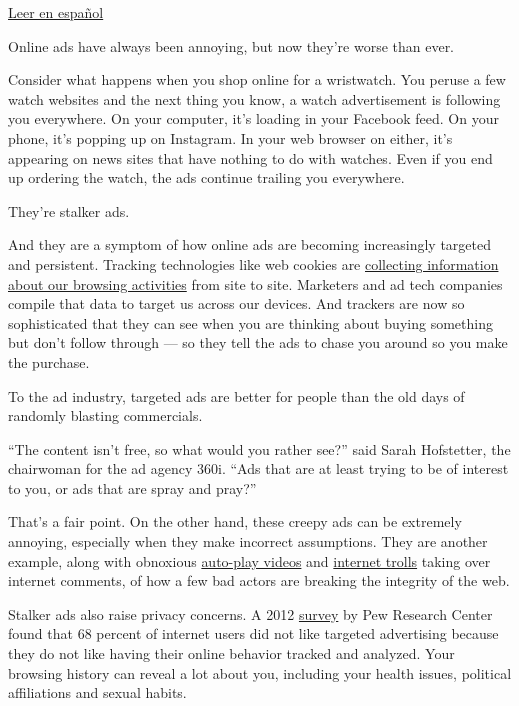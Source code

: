 \href{https://www.nytimes.com/es/2018/08/18/asi-puedes-acabar-con-el-acoso-publicitario/}{Leer
en español}

Online ads have always been annoying, but now they're worse than ever.

Consider what happens when you shop online for a wristwatch. You peruse
a few watch websites and the next thing you know, a watch advertisement
is following you everywhere. On your computer, it's loading in your
Facebook feed. On your phone, it's popping up on Instagram. In your web
browser on either, it's appearing on news sites that have nothing to do
with watches. Even if you end up ordering the watch, the ads continue
trailing you everywhere.

They're stalker ads.

And they are a symptom of how online ads are becoming increasingly
targeted and persistent. Tracking technologies like web cookies are
\href{https://www.nytimes.com/2016/02/18/technology/personaltech/free-tools-to-keep-those-creepy-online-ads-from-watching-you.html}{collecting
information about our browsing activities} from site to site. Marketers
and ad tech companies compile that data to target us across our devices.
And trackers are now so sophisticated that they can see when you are
thinking about buying something but don't follow through --- so they
tell the ads to chase you around so you make the purchase.

To the ad industry, targeted ads are better for people than the old days
of randomly blasting commercials.

``The content isn't free, so what would you rather see?'' said Sarah
Hofstetter, the chairwoman for the ad agency 360i. ``Ads that are at
least trying to be of interest to you, or ads that are spray and pray?''

That's a fair point. On the other hand, these creepy ads can be
extremely annoying, especially when they make incorrect assumptions.
They are another example, along with obnoxious
\href{https://www.nytimes.com/2018/08/01/technology/personaltech/autoplay-video-fight-them.html}{auto-play
videos} and
\href{https://www.nytimes.com/2018/08/08/technology/personaltech/internet-trolls-comments.html}{internet
trolls} taking over internet comments, of how a few bad actors are
breaking the integrity of the web.

Stalker ads also raise privacy concerns. A 2012
\href{http://www.pewinternet.org/2012/03/09/main-findings-11/}{survey}
by Pew Research Center found that 68 percent of internet users did not
like targeted advertising because they do not like having their online
behavior tracked and analyzed. Your browsing history can reveal a lot
about you, including your health issues, political affiliations and
sexual habits.


